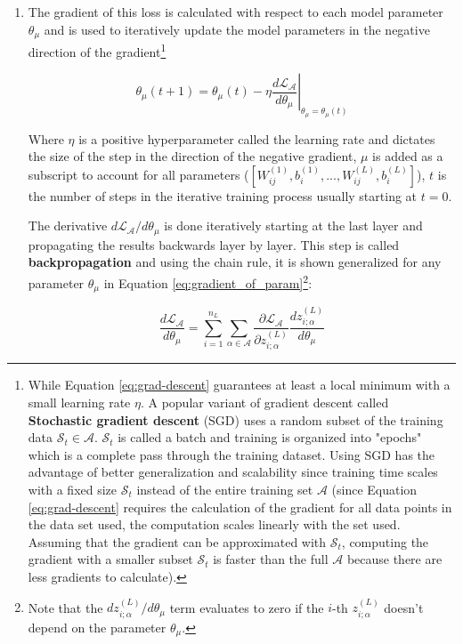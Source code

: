 \begin{enumerate}
    \item The gradient of this loss is calculated with respect to each model parameter $\theta_\mu$ and is used to iteratively update the model parameters in the negative direction of the gradient\footnote{While Equation \ref{eq:grad-descent} guarantees at least a local minimum with a small learning rate $\eta$. A popular variant of gradient descent called \textbf{Stochastic gradient descent} (SGD) uses a random subset of the training data $\mathcal{S}_t \in \mathcal{A}$. $\mathcal{S}_t$ is called a batch and training is organized into "epochs" which is a complete pass through the training dataset. Using SGD has the advantage of better generalization and scalability since training time scales with a fixed size $\mathcal{S}_t$ instead of the entire training set $\mathcal{A}$ (since Equation \ref{eq:grad-descent} requires the calculation of the gradient for all data points in the data set used, the computation scales linearly with the set used. Assuming that the gradient can be approximated with $\mathcal{S}_t$, computing the gradient with a smaller subset $\mathcal{S}_t$ is faster than the full $\mathcal{A}$ because there are less gradients to calculate).}

    \begin{equation}
        \label{eq:grad-descent}
        \theta_\mu(t+1) = \theta_\mu(t) - \eta \left. {\frac{d\mathcal{L}_\mathcal{A}}{d\theta_\mu}}\right|_{\theta_\mu = \theta_\mu(t)}
    \end{equation}

    Where $\eta$ is a positive hyperparameter called the learning rate and dictates the size of the step in the direction of the negative gradient, $\mu$ is added as a subscript to account for all parameters ($[W_{ij}^{(1)}, b_i^{(1)}, ..., W_{ij}^{(L)}, b_i^{(L)}]$), $t$ is the number of steps in the iterative training process usually starting at $t=0$.

    The derivative $d\mathcal{L}_\mathcal{A} / d\theta_\mu$ is done iteratively starting at the last layer and propagating the results backwards layer by layer. This step is called \textbf{backpropagation} and using the chain rule, it is shown generalized for any parameter $\theta_\mu$ in Equation \ref{eq:gradient_of_param}\footnote{Note that the $dz^{(L)}_{i;\alpha}/d\theta_\mu$ term evaluates to zero if the $i$-th $z_{i;\alpha}^{(L)}$ doesn't depend on the parameter $\theta_\mu$.}:

    \begin{equation}
        \label{eq:gradient_of_param}
        \frac{d\mathcal{L}_\mathcal{A}}{d\theta_\mu} = \sum^{n_{L}}_{i=1} \sum_{\alpha\in\mathcal{A}} \frac{\partial\mathcal{L}_\mathcal{A}}{\partial z_{i;\alpha}^{(L)}} \frac{dz_{i;\alpha}^{(L)}}{d\theta_\mu}
    \end{equation}


\end{enumerate}
